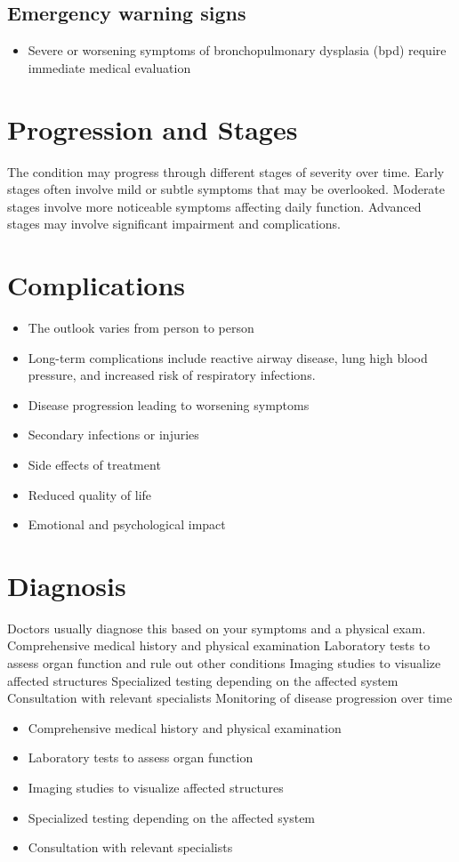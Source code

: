 \subsection{Emergency warning signs}
\begin{itemize}[noitemsep]
  \item Severe or worsening symptoms of bronchopulmonary dysplasia (bpd) require immediate medical evaluation
\end{itemize}
\section{Progression and Stages}
The condition may progress through different stages of severity over time. Early stages often involve mild or subtle symptoms that may be overlooked. Moderate stages involve more noticeable symptoms affecting daily function. Advanced stages may involve significant impairment and complications.
\section{Complications}
\begin{itemize}[noitemsep]
  \item The outlook varies from person to person
  \item Long-term complications include reactive airway disease, lung high blood pressure, and increased risk of respiratory infections.
  \item Disease progression leading to worsening symptoms
  \item Secondary infections or injuries
  \item Side effects of treatment
  \item Reduced quality of life
  \item Emotional and psychological impact
\end{itemize}
\section{Diagnosis}
Doctors usually diagnose this based on your symptoms and a physical exam. Comprehensive medical history and physical examination Laboratory tests to assess organ function and rule out other conditions Imaging studies to visualize affected structures Specialized testing depending on the affected system Consultation with relevant specialists Monitoring of disease progression over time

\begin{itemize}[noitemsep]
  \item Comprehensive medical history and physical examination
  \item Laboratory tests to assess organ function
  \item Imaging studies to visualize affected structures
  \item Specialized testing depending on the affected system
  \item Consultation with relevant specialists
\end{itemize}
